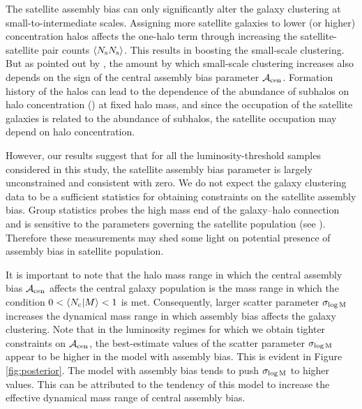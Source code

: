 \documentclass[12pt, preprint]{aastex}
\newcommand{\sigmam}{\sigma_{\log \rm M}}
\newcommand{\acen}{\mathcal{A}_{\rm cen}}
\begin{document}
The satellite assembly bias can only significantly alter the galaxy clustering at small-to-intermediate scales. Assigning more satellite galaxies to lower (or higher) concentration halos affects the one-halo term through increasing the satellite-satellite pair counts $\langle N_{\rm s} N_{\rm s} \rangle$. This results in boosting the small-scale clustering. But as pointed out by \citet{decorated}, the amount by which small-scale clustering increases also depends on the sign of the central assembly bias parameter $\acen$. Formation history of the halos can lead to the dependence of the abundance of subhalos on halo concentration (\citealt{zentner2005, mao2015}) at fixed halo mass, and since the occupation of the satellite galaxies is related to the abundance of subhalos, the satellite occupation may depend on halo concentration. 

However, our results suggest that for all the luminosity-threshold samples considered in this study, the satellite assembly bias parameter is largely unconstrained and consistent with zero. We do not expect the galaxy clustering data to be a sufficient statistics for obtaining constraints on the satellite assembly bias. Group statistics probes the high mass end of the galaxy--halo connection and is sensitive to the parameters governing the satellite population (see \citealt{sham_gmf, 2016arXiv160701782H}). Therefore these measurements may shed some light on potential presence of assembly bias in satellite population.   

It is important to note that the halo mass range in which the central assembly bias $\acen$ affects the central galaxy population is the mass range in which the condition $0<\langle N_{\rm c}|M \rangle<1$ is met. Consequently, larger scatter parameter $\sigmam$ increases the dynamical mass range in which assembly bias affects the galaxy clustering. Note that in the luminosity regimes for which we obtain tighter constraints on $\acen$, the best-estimate values of the scatter parameter $\sigmam$ appear to be higher in the model with assembly bias. This is evident in Figure \ref{fig:posterior}. The model with assembly bias tends to push $\sigmam$ to higher values. This can be attributed to the tendency of this model to increase the effective dynamical mass range of central assembly bias.
\end{document}
